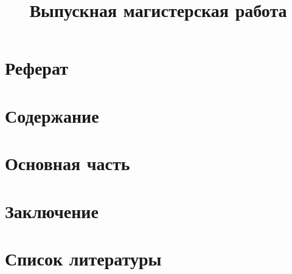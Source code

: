 \documentclass[12pt,a4paper]{report} %
\begin{document}
\title{Выпускная магистерская работа}



\tableofcontents

\section{Реферат}


\section{Содержание}


\section{Основная часть}


\section{Заключение}


\section{Список литературы}

\end{document}
